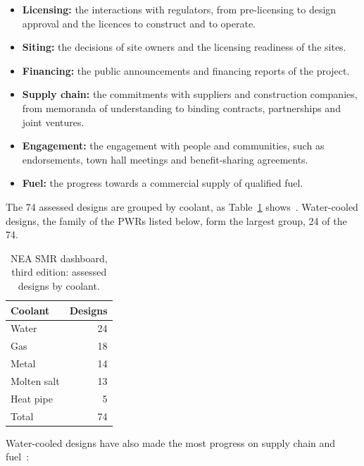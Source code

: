 \begin{itemize}
  \item \textbf{Licensing:} the interactions with regulators, from
        pre-licensing to design approval and the licences to construct
        and to operate.

  \item \textbf{Siting:} the decisions of site owners and the licensing
        readiness of the sites.

  \item \textbf{Financing:} the public announcements and financing reports
        of the project.

  \item \textbf{Supply chain:} the commitments with suppliers and
        construction companies, from memoranda of understanding to
        binding contracts, partnerships and joint ventures.

  \item \textbf{Engagement:} the engagement with people and communities,
        such as endorsements, town hall meetings and benefit-sharing
        agreements.

  \item \textbf{Fuel:} the progress towards a commercial supply of
        qualified fuel.
\end{itemize}

The 74 assessed designs are grouped by coolant, as
Table~\ref{tab:nea-coolant} shows~\cite{nea_dashboard_2025}. Water-cooled
designs, the family of the PWRs listed below, form the largest group,
24 of the 74.

\begin{table}[htbp]
  \centering
  \caption{NEA SMR dashboard, third edition: assessed designs by coolant.}
  \label{tab:nea-coolant}
  \small
  \begin{tabular}{@{}lr@{}}
    \toprule
    Coolant & Designs \\
    \midrule
    Water & 24 \\
    Gas & 18 \\
    Metal & 14 \\
    Molten salt & 13 \\
    Heat pipe & 5 \\
    \midrule
    Total & 74 \\
    \bottomrule
  \end{tabular}
\end{table}

Water-cooled designs have also made the most progress on supply chain
and fuel~\cite{nea_dashboard_2025}:

